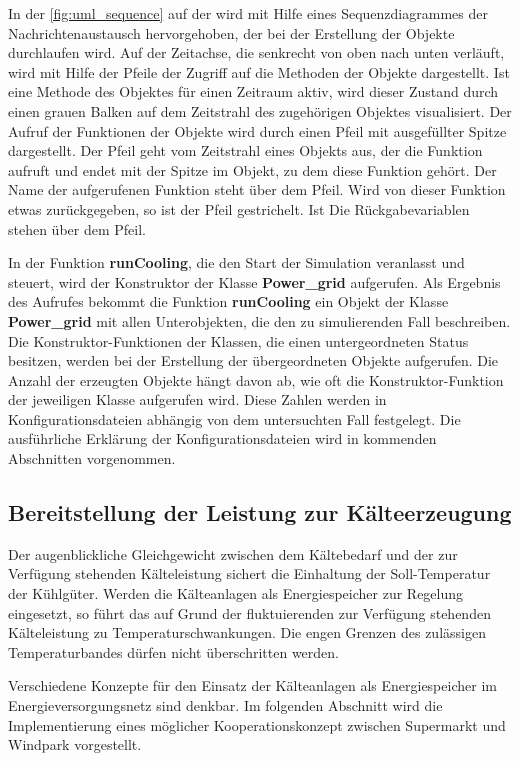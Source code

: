 In der \cref{fig:uml_sequence} auf der \pageref{fig:uml_sequence} wird mit Hilfe
eines Sequenzdiagrammes der Nachrichtenaustausch hervorgehoben, der bei der
Erstellung der Objekte durchlaufen wird. Auf der Zeitachse, die senkrecht von
oben nach unten verl\"auft, wird mit Hilfe der Pfeile der Zugriff auf die
Methoden der Objekte dargestellt. Ist eine Methode des Objektes f\"ur einen
Zeitraum aktiv, wird dieser Zustand durch einen grauen Balken auf dem Zeitstrahl
des zugeh\"origen Objektes visualisiert. Der Aufruf der Funktionen der Objekte
wird durch einen Pfeil mit ausgef\"ullter Spitze dargestellt. Der Pfeil geht vom
Zeitstrahl eines Objekts aus, der die Funktion aufruft und endet mit der Spitze
im Objekt, zu dem diese Funktion geh\"ort. Der Name der aufgerufenen Funktion
steht \"uber dem Pfeil. Wird von dieser Funktion etwas zur\"uckgegeben, so ist
der Pfeil gestrichelt. Ist Die R\"uckgabevariablen stehen \"uber dem Pfeil.

In der Funktion \textbf{runCooling}, die den Start der Simulation veranlasst und
steuert, wird der Konstruktor der Klasse \textbf{Power\_grid} aufgerufen. Als
Ergebnis des Aufrufes bekommt die Funktion \textbf{runCooling} ein Objekt der
Klasse \textbf{Power\_grid} mit allen Unterobjekten, die den zu simulierenden
Fall beschreiben. Die Konstruktor-Funktionen der Klassen, die einen
untergeordneten Status besitzen, werden bei der Erstellung der \"ubergeordneten
Objekte aufgerufen. Die Anzahl der erzeugten Objekte h\"angt davon ab, wie oft
die Konstruktor-Funktion der jeweiligen Klasse aufgerufen wird. Diese Zahlen
werden in Konfigurationsdateien abh\"angig von dem untersuchten Fall festgelegt.
Die ausf\"uhrliche Erkl\"arung der Konfigurationsdateien wird in kommenden
Abschnitten vorgenommen.

\subsection*{Bereitstellung der Leistung zur K\"alteerzeugung}

Der augenblickliche Gleichgewicht zwischen dem K\"altebedarf und der zur
Verf\"ugung stehenden K\"alteleistung sichert die Einhaltung der Soll-Temperatur
der K\"uhlg\"uter. Werden die K\"alteanlagen als Energiespeicher zur Regelung
eingesetzt, so f\"uhrt das auf Grund der fluktuierenden zur Verf\"ugung
stehenden K\"alteleistung zu Temperaturschwankungen. Die engen Grenzen des
zul\"assigen Temperaturbandes d\"urfen nicht \"uberschritten werden.

Verschiedene Konzepte f\"ur den Einsatz der K\"alteanlagen als Energiespeicher
im Energieversorgungsnetz sind denkbar. Im folgenden Abschnitt wird die
Implementierung eines m\"oglicher Kooperationskonzept zwischen Supermarkt und
Windpark vorgestellt.

